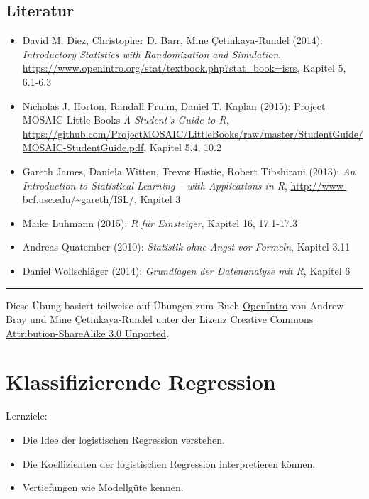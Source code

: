 \documentclass[12pt,ngerman,]{book}
\providecommand{\tightlist}{%
  \setlength{\itemsep}{0pt}\setlength{\parskip}{0pt}}
\let\BeginKnitrBlock\begin \let\EndKnitrBlock\end
\begin{document}
\section{Literatur}\label{literatur-1}

\begin{itemize}
\tightlist
\item
  David M. Diez, Christopher D. Barr, Mine Çetinkaya-Rundel (2014):
  \emph{Introductory Statistics with Randomization and Simulation},
  \url{https://www.openintro.org/stat/textbook.php?stat_book=isrs},
  Kapitel 5, 6.1-6.3
\item
  Nicholas J. Horton, Randall Pruim, Daniel T. Kaplan (2015): Project
  MOSAIC Little Books \emph{A Student's Guide to R},
  \url{https://github.com/ProjectMOSAIC/LittleBooks/raw/master/StudentGuide/MOSAIC-StudentGuide.pdf},
  Kapitel 5.4, 10.2
\item
  Gareth James, Daniela Witten, Trevor Hastie, Robert Tibshirani (2013):
  \emph{An Introduction to Statistical Learning -- with Applications in
  R}, \url{http://www-bcf.usc.edu/~gareth/ISL/}, Kapitel 3
\item
  Maike Luhmann (2015): \emph{R für Einsteiger}, Kapitel 16, 17.1-17.3
\item
  Andreas Quatember (2010): \emph{Statistik ohne Angst vor Formeln},
  Kapitel 3.11
\item
  Daniel Wollschläger (2014): \emph{Grundlagen der Datenanalyse mit R},
  Kapitel 6
\end{itemize}

\begin{center}\rule{0.5\linewidth}{\linethickness}\end{center}

Diese Übung basiert teilweise auf Übungen zum Buch
\href{https://www.openintro.org/stat/index.php?stat_book=isrs}{OpenIntro}
von Andrew Bray und Mine Çetinkaya-Rundel unter der Lizenz
\href{http://creativecommons.org/licenses/by-sa/3.0}{Creative Commons
Attribution-ShareAlike 3.0 Unported}.

\chapter{Klassifizierende Regression}\label{klassifizierende-regression}

\BeginKnitrBlock{rmdcaution}
Lernziele:

\begin{itemize}
\tightlist
\item
  Die Idee der logistischen Regression verstehen.
\item
  Die Koeffizienten der logistischen Regression interpretieren können.
\item
  Vertiefungen wie Modellgüte kennen.
\end{itemize}
\EndKnitrBlock{rmdcaution}
\end{document}
